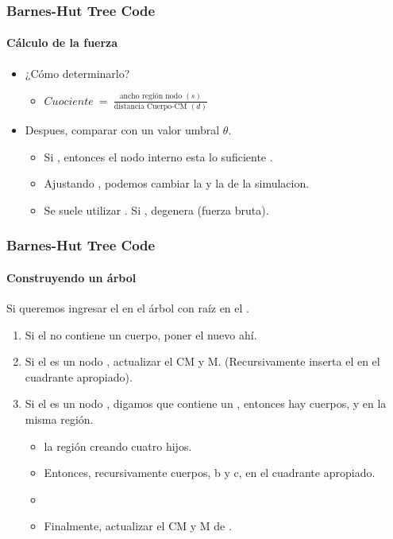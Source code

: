\frame
{
\frametitle{Barnes-Hut Tree Code}
\framesubtitle{Cálculo de la fuerza}

\begin{itemize}
	\item ¿Cómo determinarlo?
	\begin{itemize}
		\item $ Cuociente\ =\ \frac{\text{ancho región nodo }(s)}{\text{distancia Cuerpo-CM }(d)}$
	\end{itemize}
	\item Despues, comparar con un valor umbral $\theta$.
	\begin{itemize}
		\item Si , entonces el nodo interno esta lo suficiente .
		\item Ajustando \blue{$\theta$}, podemos cambiar la  y la  de la simulacion.
		\item Se suele utilizar . Si , degenera (fuerza bruta).
	\end{itemize}
\end{itemize}
}

\frame
{
\frametitle{Barnes-Hut Tree Code}
\framesubtitle{Construyendo un árbol}

Si queremos ingresar el  en el árbol con raíz en el .

\begin{enumerate}
	\item<1-> Si el  no contiene un cuerpo, poner el nuevo  ahí.
	\item<2-> Si el  es un nodo , actualizar el CM
		y M. (Recursivamente inserta el  en el cuadrante apropiado).
	\item<3-> Si el  es un nodo , digamos que contiene un , entonces hay  cuerpos,  y  en la misma región.
		\begin{itemize}
			\item<4->  la región creando cuatro hijos.
			\item<5-> Entonces, recursivamente  cuerpos, b y c, en el cuadrante apropiado.
			\item<6-> 
			\item<7-> Finalmente, actualizar el CM y M de .
		\end{itemize}
\end{enumerate}
}

